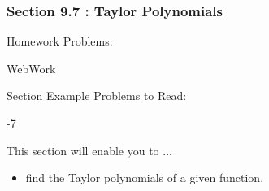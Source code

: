 %
%

\begin{frame}
\frametitle{\LARGE {\color[rgb]{0.02,0.20,1.0} Section 9.7 : Taylor Polynomials}}
\scriptsize
\vspace{0.8cm}
\begin{block}{Homework Problems:}

\vspace{0.2cm}
\centering
WebWork
	
\end{block}
\vspace{0.5cm}

\begin{block}{Section Example Problems to Read:}

\vspace{0.2cm}
-7
\end{block}
\vspace{0.3cm}

\begin{block}{This section will enable you to ...}
\begin{itemize}
	\item[...] find the Taylor polynomials of a given function.
\end{itemize}
\end{block}
\vspace{3.0cm}
\end{frame}

